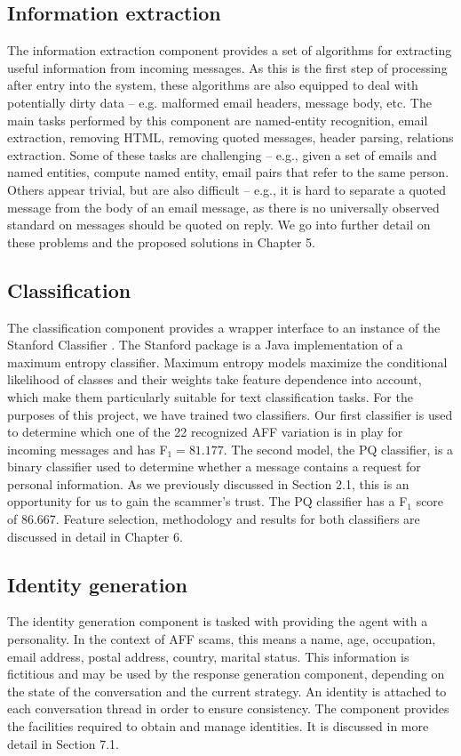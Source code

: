 \subsection*{Information extraction}
The information extraction component provides a set of algorithms for extracting useful information from incoming messages. As this is the first step of processing after entry into the system, these algorithms are also equipped to deal with potentially dirty data -- e.g. malformed email headers, message body, etc. The main tasks performed by this component are named-entity recognition, email extraction, removing HTML, removing quoted messages, header parsing, relations extraction. Some of these tasks are challenging -- e.g., given a set of emails and named entities, compute named entity, email pairs that refer to the same person. Others appear trivial, but are also difficult -- e.g., it is hard to separate a quoted message from the body of an email message, as there is no universally observed standard on messages should be quoted on reply. We go into further detail on these problems and the proposed solutions in Chapter 5.

\subsection*{Classification}
The classification component provides a wrapper interface to an instance of the Stanford Classifier \cite{P13}. The Stanford package is a Java implementation of a maximum entropy classifier. Maximum entropy models maximize the conditional likelihood of classes and their weights take feature dependence into account, which make them particularly suitable for text classification tasks. For the purposes of this project, we have trained two classifiers. Our first classifier is used to determine which one of the 22 recognized AFF variation is in play for incoming messages and has F$_{1} = 81.177$. The second model, the PQ classifier, is a binary classifier used to determine whether a message contains a request for personal information. As we previously discussed in Section 2.1, this is an opportunity for us to gain the scammer's trust. The PQ classifier has a F$_{1}$ score of 86.667. Feature selection, methodology and results for both classifiers are discussed in detail in Chapter 6.

\subsection*{Identity generation}
The identity generation component is tasked with providing the agent with a personality. In the context of AFF scams, this means a name, age, occupation, email address, postal address, country, marital status. This information is fictitious and may be used by the response generation component, depending on the state of the conversation and the current strategy. An identity is attached to each conversation thread in order to ensure consistency. The component provides the facilities required to obtain and manage identities. It is discussed in more detail in Section 7.1.

